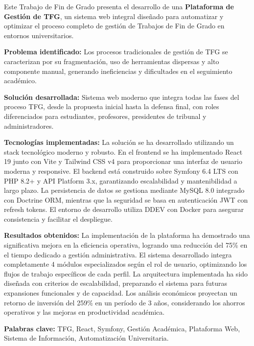 Este Trabajo de Fin de Grado presenta el desarrollo de una \textbf{Plataforma 
de Gestión de TFG}, un sistema web integral diseñado para automatizar y 
optimizar el proceso completo de gestión de Trabajos de Fin de Grado en 
entornos universitarios.

\textbf{Problema identificado:} Los procesos tradicionales de gestión de TFG 
se caracterizan por su fragmentación, uso de herramientas dispersas y 
alto componente manual, generando ineficiencias y dificultades en el 
seguimiento académico.

\textbf{Solución desarrollada:} Sistema web moderno que integra todas las 
fases del proceso TFG, desde la propuesta inicial hasta la defensa final, 
con roles diferenciados para estudiantes, profesores, presidentes de 
tribunal y administradores.

\textbf{Tecnologías implementadas:} La solución se ha desarrollado utilizando un stack tecnológico moderno y robusto. En el frontend se ha implementado React 19 junto con Vite y Tailwind CSS v4 para proporcionar una interfaz de usuario moderna y responsive. El backend está construido sobre Symfony 6.4 LTS con PHP 8.2+ y API Platform 3.x, garantizando escalabilidad y mantenibilidad a largo plazo. La persistencia de datos se gestiona mediante MySQL 8.0 integrado con Doctrine ORM, mientras que la seguridad se basa en autenticación JWT con refresh tokens. El entorno de desarrollo utiliza DDEV con Docker para asegurar consistencia y facilitar el despliegue.

\textbf{Resultados obtenidos:} La implementación de la plataforma ha demostrado una significativa mejora en la eficiencia operativa, logrando una reducción del 75\% en el tiempo dedicado a gestión administrativa. El sistema desarrollado integra completamente 4 módulos especializados según el rol de usuario, optimizando los flujos de trabajo específicos de cada perfil. La arquitectura implementada ha sido diseñada con criterios de escalabilidad, preparando el sistema para futuras expansiones funcionales y de capacidad. Los análisis económicos proyectan un retorno de inversión del 259\% en un período de 3 años, considerando los ahorros operativos y las mejoras en productividad académica.

\textbf{Palabras clave:} TFG, React, Symfony, Gestión Académica, Plataforma Web, 
Sistema de Información, Automatización Universitaria.

